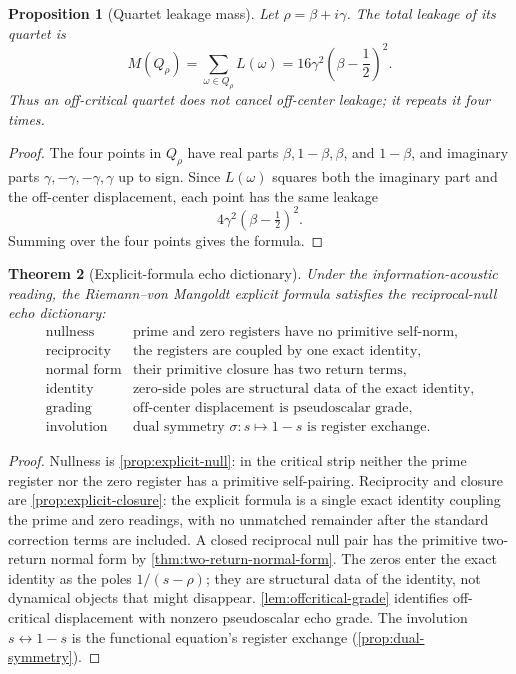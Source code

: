 \documentclass[11pt,a4paper]{article}
\theoremstyle{plain}
\newtheorem{theorem}{Theorem}[section]
\newtheorem{proposition}[theorem]{Proposition}
\theoremstyle{definition}
\theoremstyle{remark}
\numberwithin{equation}{section}
\begin{document}
\begin{proposition}[Quartet leakage mass]
\label{prop:quartet-leakage}
Let \(\rho=\beta+i\gamma\).  The total leakage of its quartet is
\[
  M(Q_\rho)
  =
  \sum_{\omega\in Q_\rho}L(\omega)
  =
  16\gamma^2\left(\beta-\frac12\right)^2.
\]
Thus an off-critical quartet does not cancel off-center leakage; it
repeats it four times.
\end{proposition}

\begin{proof}
The four points in \(Q_\rho\) have real parts \(\beta,1-\beta,\beta\),
and \(1-\beta\), and imaginary parts \(\gamma,-\gamma,-\gamma,\gamma\)
up to sign.  Since \(L(\omega)\) squares both the imaginary part and the
off-center displacement, each point has the same leakage
\[
  4\gamma^2(\beta-\tfrac12)^2.
\]
Summing over the four points gives the formula.
\end{proof}

\begin{theorem}[Explicit-formula echo dictionary]
\label{thm:explicit-echo-dictionary}
Under the information-acoustic reading, the Riemann--von Mangoldt
explicit formula satisfies the reciprocal-null echo dictionary:
\[
\begin{array}{ll}
\text{nullness} & \text{prime and zero registers have no primitive self-norm},\\
\text{reciprocity} & \text{the registers are coupled by one exact identity},\\
\text{normal form} & \text{their primitive closure has two return terms},\\
\text{identity} & \text{zero-side poles are structural data of the exact identity},\\
\text{grading} & \text{off-center displacement is pseudoscalar grade},\\
\text{involution} & \text{dual symmetry }\sigma\colon s\mapsto1{-}s
  \text{ is register exchange}.
\end{array}
\]
\end{theorem}

\begin{proof}
Nullness is \cref{prop:explicit-null}: in the critical strip neither the
prime register nor the zero register has a primitive self-pairing.
Reciprocity and closure are \cref{prop:explicit-closure}: the explicit
formula is a single exact identity coupling the prime and zero readings,
with no unmatched remainder after the standard correction terms are
included.  A closed reciprocal null pair has the primitive two-return
normal form by \cref{thm:two-return-normal-form}.  The zeros enter the
exact identity as the poles \(1/(s-\rho)\); they are structural data of
the identity, not dynamical objects that might disappear.
\cref{lem:offcritical-grade} identifies off-critical displacement
with nonzero pseudoscalar echo grade.  The involution
\(s\leftrightarrow1-s\) is the functional equation's register exchange
(\cref{prop:dual-symmetry}).
\end{proof}
\end{document}
